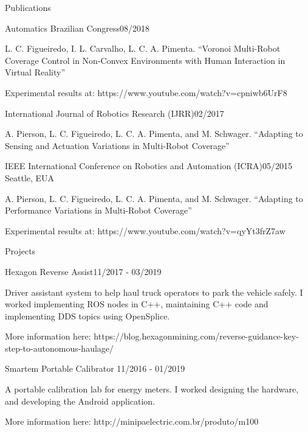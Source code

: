 \documentclass[14pt, a4paper]{resume} %
\begin{document}
\begin{rSection}{Publications}
	
\begin{rSubsection}{Automatics Brazilian Congress}{08/2018}{}{}
	
\item L. C. Figueiredo, I. L. Carvalho, L. C. A. Pimenta. ``Voronoi Multi-Robot Coverage Control in Non-Convex Environments with Human Interaction in Virtual Reality''
\item Experimental results at: https://www.youtube.com/watch?v=cpniwb6UrF8

\end{rSubsection}	
	
\begin{rSubsection}{International Journal of Robotics Research (IJRR)}{02/2017}{}{}
	
\item A. Pierson, L. C. Figueiredo, L. C. A. Pimenta, and M. Schwager. ``Adapting to Sensing and Actuation Variations in Multi-Robot Coverage''

\end{rSubsection}

\begin{rSubsection}{IEEE International Conference on Robotics and Automation (ICRA)}{05/2015}{}{ \normalfont Seattle, EUA}

\item A. Pierson, L. C. Figueiredo, L. C. A. Pimenta, and M. Schwager. ``Adapting to Performance Variations in Multi-Robot Coverage''
\item Experimental results at: https://www.youtube.com/watch?v=qyYt3frZ7aw


\end{rSubsection}


\end{rSection}

\begin{rSection}{Projects}
	\begin{rSubsection}{Hexagon Reverse Assist}{11/2017 - 03/2019}{}{}
		\item Driver assistant system to help haul truck operators to park the vehicle safely. I worked implementing ROS nodes in C++, maintaining C++ code and implementing DDS topics using OpenSplice.
		\item More information here: https://blog.hexagonmining.com/reverse-guidance-key-step-to-autonomous-haulage/
	\end{rSubsection}
	
	
	\begin{rSubsection}{Smartem Portable Calibrator	}{11/2016 - 01/2019}{}{}
		\item A portable calibration lab for energy meters. I worked designing the hardware, and developing the Android application.
		\item More information here: http://minipaelectric.com.br/produto/m100
	\end{rSubsection}
\end{rSection}
\end{document}
